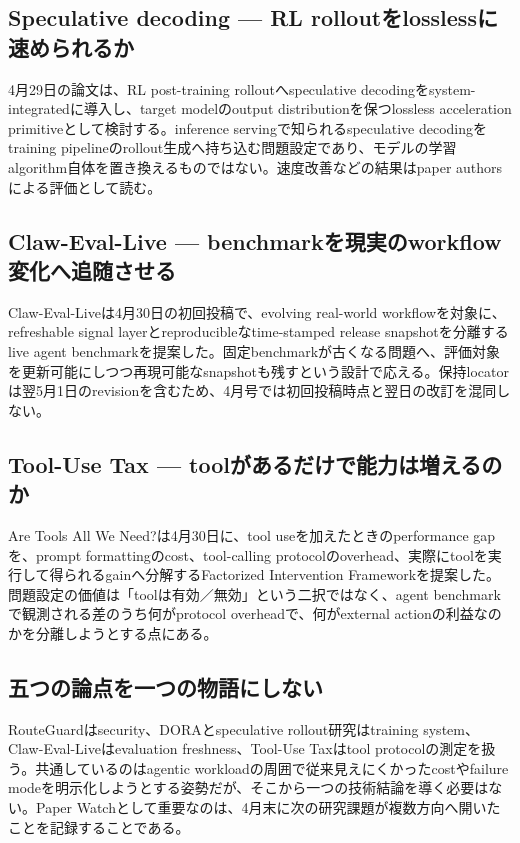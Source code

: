 \subsection{Speculative decoding — RL rolloutをlosslessに速められるか}

4月29日の論文は、RL post-training rolloutへspeculative decodingをsystem-integratedに導入し、target modelのoutput distributionを保つlossless acceleration primitiveとして検討する。inference servingで知られるspeculative decodingをtraining pipelineのrollout生成へ持ち込む問題設定であり、モデルの学習algorithm自体を置き換えるものではない。速度改善などの結果はpaper authorsによる評価として読む。\autocite{src-8e578daed9ed}


\subsection{Claw-Eval-Live — benchmarkを現実のworkflow変化へ追随させる}

Claw-Eval-Liveは4月30日の初回投稿で、evolving real-world workflowを対象に、refreshable signal layerとreproducibleなtime-stamped release snapshotを分離するlive agent benchmarkを提案した。固定benchmarkが古くなる問題へ、評価対象を更新可能にしつつ再現可能なsnapshotも残すという設計で応える。保持locatorは翌5月1日のrevisionを含むため、4月号では初回投稿時点と翌日の改訂を混同しない。\autocite{src-841d4b563b9d}


\subsection{Tool-Use Tax — toolがあるだけで能力は増えるのか}

Are Tools All We Need?は4月30日に、tool useを加えたときのperformance gapを、prompt formattingのcost、tool-calling protocolのoverhead、実際にtoolを実行して得られるgainへ分解するFactorized Intervention Frameworkを提案した。問題設定の価値は「toolは有効／無効」という二択ではなく、agent benchmarkで観測される差のうち何がprotocol overheadで、何がexternal actionの利益なのかを分離しようとする点にある。\autocite{src-56e226358d6f}


\subsection{五つの論点を一つの物語にしない}

RouteGuardはsecurity、DORAとspeculative rollout研究はtraining system、Claw-Eval-Liveはevaluation freshness、Tool-Use Taxはtool protocolの測定を扱う。共通しているのはagentic workloadの周囲で従来見えにくかったcostやfailure modeを明示化しようとする姿勢だが、そこから一つの技術結論を導く必要はない。Paper Watchとして重要なのは、4月末に次の研究課題が複数方向へ開いたことを記録することである。\autocite{src-0d99a9f2485e,src-56e226358d6f,src-6bd60c76cba7,src-841d4b563b9d,src-8e578daed9ed}


